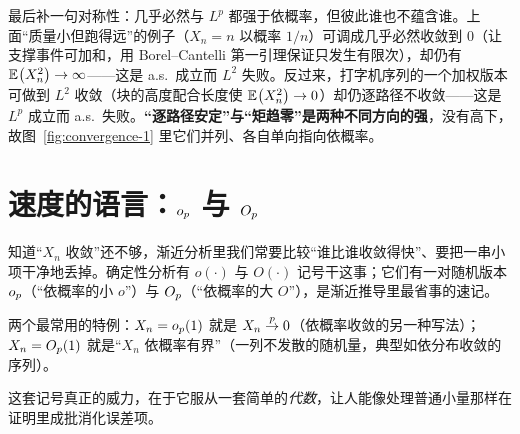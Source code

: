 最后补一句对称性：几乎必然与 $L^p$ 都强于依概率，但彼此谁也不蕴含谁。上面``质量小但跑得远''的例子（$X_n=n$ 以概率 $1/n$）可调成几乎必然收敛到 $0$（让支撑事件可加和，用 Borel--Cantelli 第一引理保证只发生有限次），却仍有 $\mathbb{E}_{}\!\left(X_n^2\right)\to\infty$——这是 a.s.\ 成立而 $L^2$ 失败。反过来，打字机序列的一个加权版本可做到 $L^2$ 收敛（块的高度配合长度使 $\mathbb{E}_{}\!\left(X_n^2\right)\to0$）却仍逐路径不收敛——这是 $L^p$ 成立而 a.s.\ 失败。\textbf{``逐路径安定''与``矩趋零''是两种不同方向的强}，没有高下，故图~\ref{fig:convergence-1} 里它们并列、各自单向指向依概率。

\section{速度的语言：$o_{p}$ 与 $O_{p}$}
\label{sec:convergence-5}

知道``$X_n$ 收敛''还不够，渐近分析里我们常要比较``谁比谁收敛得快''、要把一串小项干净地丢掉。确定性分析有 $o(\cdot)$ 与 $O(\cdot)$ 记号干这事；它们有一对随机版本 $o_{p}$（``依概率的小 $o$''）与 $O_{p}$（``依概率的大 $O$''），是渐近推导里最省事的速记。


两个最常用的特例：$X_n=o_{p}(1)$ 就是 $X_n\overset{p}{\to}0$（依概率收敛的另一种写法）；$X_n=O_{p}(1)$ 就是``$X_n$ 依概率有界''（一列不发散的随机量，典型如依分布收敛的序列）。


这套记号真正的威力，在于它服从一套简单的\emph{代数}，让人能像处理普通小量那样在证明里成批消化误差项。

